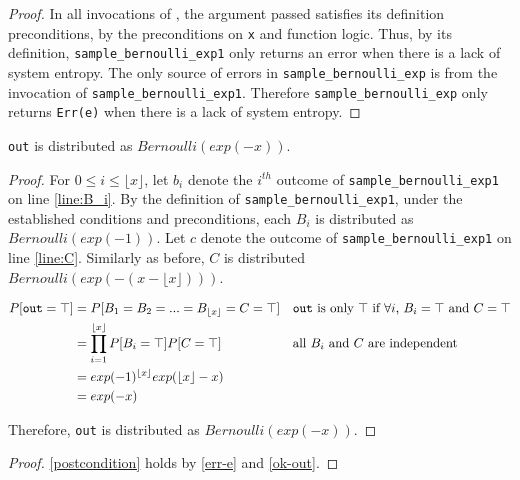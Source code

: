 \documentclass{article}
\begin{document}
\begin{proof} 
    In all invocations of , the argument passed satisfies its definition preconditions,  
    by the preconditions on \texttt{x} and function logic. 
    Thus, by its definition, \texttt{sample\_bernoulli\_exp1} only returns an error when there is a lack of system entropy. 
    The only source of errors in \texttt{sample\_bernoulli\_exp} is from the invocation of \texttt{sample\_bernoulli\_exp1}. 
    Therefore \texttt{sample\_bernoulli\_exp} only returns \texttt{Err(e)} when there is a lack of system entropy. 
\end{proof} 
 
\begin{lemma} 
    \label{ok-out} 
    \texttt{out} is distributed as $Bernoulli(exp(-x))$. 
\end{lemma} 
 
\begin{proof} 
    For $0 \le i \le \lfloor x \rfloor$, let $b_i$ denote the $i^{th}$ outcome of \texttt{sample\_bernoulli\_exp1} on line \ref{line:B_i}. 
    By the definition of \texttt{sample\_bernoulli\_exp1}, under the established conditions and preconditions, 
    each $B_i$ is distributed as $Bernoulli(exp(-1))$. 
    Let $c$ denote the outcome of \texttt{sample\_bernoulli\_exp1} on line \ref{line:C}.  
    Similarly as before, $C$ is distributed $Bernoulli(exp(-(x - \lfloor x \rfloor)))$. 
 
    \begin{align*} 
        P[\texttt{out} = \top] &= P[B_1 = B_2 = ... = B_{\lfloor x \rfloor} = C = \top] && \text{\texttt{out} is only $\top$ if $\forall i$, $B_i = \top$ and $C = \top$} \\ 
        &= \prod_{i=1}^{\lfloor x \rfloor} P[B_i = \top] P[C = \top] && \text{all $B_i$ and $C$ are independent} \\ 
        &= exp(-1)^{\lfloor x \rfloor} exp(\lfloor x \rfloor - x) \\ 
        &= exp(-x) 
    \end{align*} 
 
    Therefore, \texttt{out} is distributed as $Bernoulli(exp(-x))$. 
\end{proof} 
 
 
\begin{proof} 
    \ref{postcondition} holds by \ref{err-e} and \ref{ok-out}. 
\end{proof} 
 
 
 
 
\end{document}
